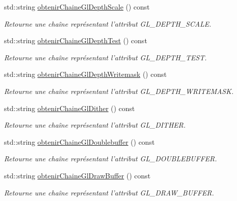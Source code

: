 \begin{DoxyCompactItemize}
std\-::string \hyperlink{group__utilitaire_ga4fac162003ef8c012c16ecd9041794ae}{obtenir\-Chaine\-Gl\-Depth\-Scale} () const 
\begin{DoxyCompactList}\small\item\em Retourne une chaîne représentant l'attribut G\-L\-\_\-\-D\-E\-P\-T\-H\-\_\-\-S\-C\-A\-L\-E. \end{DoxyCompactList}\item 
std\-::string \hyperlink{group__utilitaire_ga712bcce1fd6c63377d2b3c9c421f7559}{obtenir\-Chaine\-Gl\-Depth\-Test} () const 
\begin{DoxyCompactList}\small\item\em Retourne une chaîne représentant l'attribut G\-L\-\_\-\-D\-E\-P\-T\-H\-\_\-\-T\-E\-S\-T. \end{DoxyCompactList}\item 
std\-::string \hyperlink{group__utilitaire_gaec88db9c85bfd66909d3172982025862}{obtenir\-Chaine\-Gl\-Depth\-Writemask} () const 
\begin{DoxyCompactList}\small\item\em Retourne une chaîne représentant l'attribut G\-L\-\_\-\-D\-E\-P\-T\-H\-\_\-\-W\-R\-I\-T\-E\-M\-A\-S\-K. \end{DoxyCompactList}\item 
std\-::string \hyperlink{group__utilitaire_gabc6e75dad01908ff21a473d75483f691}{obtenir\-Chaine\-Gl\-Dither} () const 
\begin{DoxyCompactList}\small\item\em Retourne une chaîne représentant l'attribut G\-L\-\_\-\-D\-I\-T\-H\-E\-R. \end{DoxyCompactList}\item 
std\-::string \hyperlink{group__utilitaire_gae8239c45bba646389f06a6bdd49670f3}{obtenir\-Chaine\-Gl\-Doublebuffer} () const 
\begin{DoxyCompactList}\small\item\em Retourne une chaîne représentant l'attribut G\-L\-\_\-\-D\-O\-U\-B\-L\-E\-B\-U\-F\-F\-E\-R. \end{DoxyCompactList}\item 
std\-::string \hyperlink{group__utilitaire_ga3b705291c7da107645656d5dfb51872a}{obtenir\-Chaine\-Gl\-Draw\-Buffer} () const 
\begin{DoxyCompactList}\small\item\em Retourne une chaîne représentant l'attribut G\-L\-\_\-\-D\-R\-A\-W\-\_\-\-B\-U\-F\-F\-E\-R. \end{DoxyCompactList}\item 

\end{DoxyCompactItemize}
